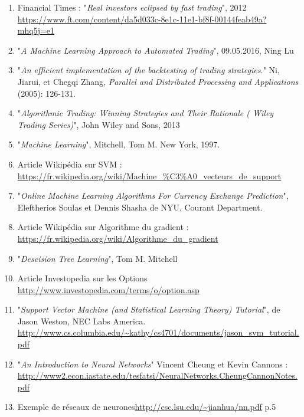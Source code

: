 \documentclass[a4paper, 11pt]{article}
\begin{document}
\begin{enumerate}
\item Financial Times : "\textit{Real investors eclipsed by fast trading}", 2012 \url{https://www.ft.com/content/da5d033c-8e1c-11e1-bf8f-00144feab49a?mhq5j=e1}
\item "\textit{A Machine Learning Approach to Automated Trading}", 09.05.2016, Ning Lu
\item "\textit{An efficient implementation of the backtesting of trading strategies.}" Ni, Jiarui, et Chegqi Zhang, \textit{Parallel and Distributed Processing and Applications} (2005): 126-131.
\item "\textit{Algorithmic Trading: Winning Strategies and Their Rationale ( Wiley Trading Series)}", John Wiley and Sons, 2013
\item "\textit{Machine Learning}", Mitchell, Tom M. New York, 1997.
\item Article Wikipédia sur SVM : \url{https://fr.wikipedia.org/wiki/Machine_\%C3\%A0_vecteurs_de_support}
\item "\textit{Online Machine Learning Algorithms For Currency Exchange Prediction}", Eleftherios Soulas et Dennis Shasha de NYU, Courant Department.
\item  Article Wikipédia sur Algorithme du gradient : \url{https://fr.wikipedia.org/wiki/Algorithme_du_gradient}
\item "\textit{Descision Tree Learning}", Tom M. Mitchell
\item Article Investopedia sur les Options \url{http://www.investopedia.com/terms/o/option.asp}
\item "\textit{Support Vector Machine (and Statistical Learning Theory) Tutorial}", de Jason Weston, NEC Labs America. \url{http://www.cs.columbia.edu/~kathy/cs4701/documents/jason_svm_tutorial.pdf}
\item  "\textit{An Introduction to Neural Networks}" Vincent Cheung et Kevin Cannons : \url{http://www2.econ.iastate.edu/tesfatsi/NeuralNetworks.CheungCannonNotes.pdf}
\item Exemple de réseaux de neurones\url{http://csc.lsu.edu/~jianhua/nn.pdf} p.5
\end{enumerate}
\end{document}
